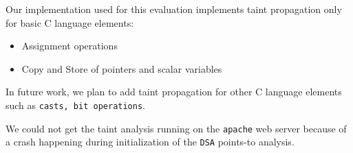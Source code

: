 Our implementation used for this evaluation implements taint
propagation only for basic C language elements:
\begin{itemize}
  \item Assignment operations
  \item Copy and Store of pointers and scalar variables
\end{itemize} 
In future work, we plan to add taint propagation for other
C language elements such as {\tt casts, bit operations}.

We could not get the taint analysis running on the \texttt{apache}
web server because of a crash happening during initialization of
the \texttt{DSA} points-to analysis.
